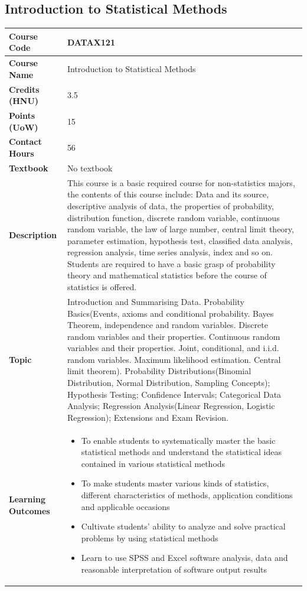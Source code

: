 \documentclass{article}
\begin{document}
\subsection[DATAX121 Introduction to Statistical Methods]{Introduction to Statistical Methods}
\renewcommand{\arraystretch}{1.5} %
\begin{longtable}{|p{3cm}|p{10cm}|}
\hline
\textbf{Course Code} & DATAX121 \\
\hline
\textbf{Course Name} & Introduction to Statistical Methods \\
\hline
\textbf{Credits (HNU)} & 3.5 \\
\hline
\textbf{Points (UoW)} & 15 \\
\hline
\textbf{Contact Hours} & 56 \\
\hline
\textbf{Textbook} & No textbook \\
\hline
\textbf{Description} & This course is a basic required course for non-statistics majors, the contents of this course include: Data and its source, descriptive analysis of data, the properties of probability, distribution function, discrete random variable, continuous random variable, the law of large number, central limit theory, parameter estimation, hypothesis test, classified data analysis, regression analysis, time series analysis, index and so on. Students are required to have a basic grasp of probability theory and mathematical statistics before the course of statistics is offered.\\
\hline
\textbf{Topic} & Introduction and Summarising Data. Probability Basics(Events, axioms and conditional probability. Bayes Theorem, independence and random variables. Discrete random variables and their properties. Continuous random variables and their properties. Joint, conditional, and i.i.d. random variables. Maximum likelihood estimation. Central limit theorem). Probability Distributions(Binomial Distribution, Normal Distribution, Sampling Concepts); Hypothesis Testing; Confidence Intervals; Categorical Data Analysis; Regression Analysis(Linear Regression, Logistic Regression); Extensions and Exam Revision. \\
\hline
\textbf{Learning Outcomes} & 
    \begin{itemize}
        \item To enable students to systematically master the basic statistical methods and understand the statistical ideas contained in various statistical methods
        \item To make students master various kinds of statistics, different characteristics of methods, application conditions and applicable occasions
        \item Cultivate students' ability to analyze and solve practical problems by using statistical methods
        \item Learn to use SPSS and Excel software analysis, data and reasonable interpretation of software output results
    \end{itemize} \\
\hline
\end{longtable}
\end{document}
